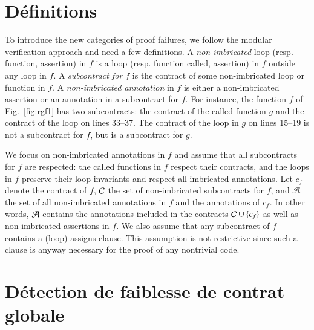 \section{Définitions}
\label{sec:swd-def}


To introduce the new categories of proof failures, we follow
the modular verification approach and need a few definitions.
A \emph{non-imbricated} loop (resp. function, assertion) in $f$ is a loop
 (resp. function called, assertion) in $f$ outside any loop in
$f$. A \emph{subcontract for $f$} is the contract of some non-imbricated loop or function
 in $f$. A \emph{non-imbricated annotation} in $f$ is either a
non-imbricated assertion or an annotation in a subcontract for $f$.
For instance, the function $f$ of Fig.~\ref{fig:rgf1} has two subcontracts:
the contract of the called function $g$ and the contract of the loop on lines 33--37.
The contract of the loop in $g$ on lines 15--19 is not a subcontract for $f$, but is a subcontract for $g$.

We focus on non-imbricated annotations in $f$ and assume  that all subcontracts for $f$ are respected:
the called functions in $f$ respect their contracts, and the loops in $f$  preserve their loop invariants
and respect all imbricated annotations.
Let $c_f$ denote the contract of $f$,
${\mathcal{C}}$ the set of non-imbricated subcontracts for $f$,
and ${\mathcal{A}}$ the set of all non-imbricated annotations in $f$ and the annotations of $c_f$.
In other words, ${\mathcal{A}}$ contains  
the annotations included in the contracts ${\mathcal{C}}\cup\{c_f\}$ as well as non-imbricated  assertions in $f$.
We also assume that any subcontract of $f$ contains a (loop) assigns clause.
This assumption is not restrictive since such a clause is anyway necessary 
for the proof of any nontrivial code.


\section{Détection de faiblesse de contrat globale}
\label{sec:swd-glob}


